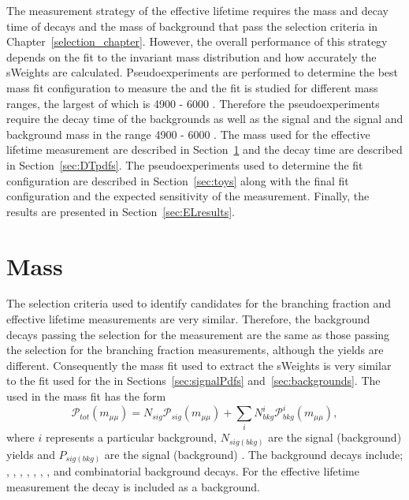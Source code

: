 The measurement strategy of the \bsmumu effective lifetime requires the mass and decay time \pdfs of \bsmumu decays and the mass \pdfs of background that pass the selection criteria in Chapter~\ref{selection_chapter}. However, the overall performance of this strategy depends on the fit to the invariant mass distribution and how accurately the sWeights are calculated.
Pseudoexperiments are performed to determine the best mass fit configuration to measure the \el and the fit is studied for different \bsmumu mass ranges, the largest of which is 4900 - 6000 \mevcc. Therefore the pseudoexperiments require the decay time \pdfs of the backgrounds as well as the signal and the signal and background mass \pdfs in the range 4900 - 6000 \mevcc.
The mass \pdfs used for the effective lifetime measurement are described in Section~\ref{sec:ELmasspdfs} and the decay time \pdfs are described in Section~\ref{sec:DTpdfs}. 
The pseudoexperiments used to determine the fit configuration are described in Section~\ref{sec:toys} along with the final fit configuration and the expected sensitivity of the measurement. 
Finally, the results are presented in Section~\ref{sec:ELresults}. 





\section{Mass \pdfs}
\label{sec:ELmasspdfs}
The selection criteria used to identify \bsmumu candidates for the \bmumu branching fraction and \bsmumu effective lifetime measurements are very similar. 
Therefore, the background decays passing the selection for the \el measurement are the same as those passing the selection for the branching fraction measurements, although the yields are different. %
Consequently the mass fit used to extract the sWeights is very similar to the fit used for the \BFm in Sections~\ref{sec:signalPdfs} and~\ref{sec:backgrounds}. The \pdf used in the mass fit has the form
\begin{equation}
\mathcal{P}_{tot}(m_{\mu\mu}) = N_{sig}\mathcal{P}_{sig}(m_{\mu\mu}) + \displaystyle\sum_{i} N^i_{bkg}\mathcal{P}^i_{bkg}(m_{\mu\mu}),
\label{eq:masspdf}
\end{equation}
where $i$ represents a particular background, $N_{sig(bkg)}$ are the signal (background) yields and $P_{sig(bkg)}$ are the signal (background) \pdfs. The background decays include; \bdmumu, \bhh, \lambdab, \bdpimunu, \bsKmunu, \bupimumu, \bdpimumu, \bcjpsimunu and combinatorial background decays. For the effective lifetime measurement the \bdmumu decay is included as a background. 


